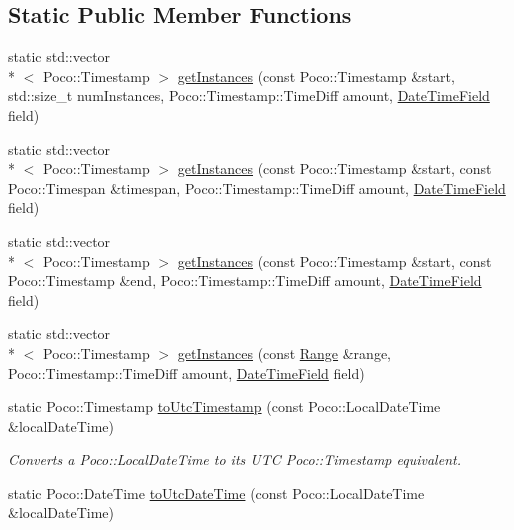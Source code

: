 \subsection*{Static Public Member Functions}
\begin{DoxyCompactItemize}
\item 
static std\-::vector\\*
$<$ Poco\-::\-Timestamp $>$ \hyperlink{classofx_1_1_time_1_1_utils_acd07a3c4b5eba6fedf1a2c744a66ac6a}{get\-Instances} (const Poco\-::\-Timestamp \&start, std\-::size\-\_\-t num\-Instances, Poco\-::\-Timestamp\-::\-Time\-Diff amount, \hyperlink{classofx_1_1_time_1_1_utils_aaab0e5bd305761231f063a0701785112}{Date\-Time\-Field} field)
\item 
static std\-::vector\\*
$<$ Poco\-::\-Timestamp $>$ \hyperlink{classofx_1_1_time_1_1_utils_a7d48dcb41c6f936a7c8d2c45e23684b7}{get\-Instances} (const Poco\-::\-Timestamp \&start, const Poco\-::\-Timespan \&timespan, Poco\-::\-Timestamp\-::\-Time\-Diff amount, \hyperlink{classofx_1_1_time_1_1_utils_aaab0e5bd305761231f063a0701785112}{Date\-Time\-Field} field)
\item 
static std\-::vector\\*
$<$ Poco\-::\-Timestamp $>$ \hyperlink{classofx_1_1_time_1_1_utils_ae91b9a0148df1a02b16be045c793b944}{get\-Instances} (const Poco\-::\-Timestamp \&start, const Poco\-::\-Timestamp \&end, Poco\-::\-Timestamp\-::\-Time\-Diff amount, \hyperlink{classofx_1_1_time_1_1_utils_aaab0e5bd305761231f063a0701785112}{Date\-Time\-Field} field)
\item 
static std\-::vector\\*
$<$ Poco\-::\-Timestamp $>$ \hyperlink{classofx_1_1_time_1_1_utils_aadd395d70f52dcfbd655baee45dc33ed}{get\-Instances} (const \hyperlink{classofx_1_1_time_1_1_range}{Range} \&range, Poco\-::\-Timestamp\-::\-Time\-Diff amount, \hyperlink{classofx_1_1_time_1_1_utils_aaab0e5bd305761231f063a0701785112}{Date\-Time\-Field} field)
\item 
\hypertarget{classofx_1_1_time_1_1_utils_a9e1c01fc626b4cf7f0c8f145b8ac7ff6}{static Poco\-::\-Timestamp \hyperlink{classofx_1_1_time_1_1_utils_a9e1c01fc626b4cf7f0c8f145b8ac7ff6}{to\-Utc\-Timestamp} (const Poco\-::\-Local\-Date\-Time \&local\-Date\-Time)}\label{classofx_1_1_time_1_1_utils_a9e1c01fc626b4cf7f0c8f145b8ac7ff6}

\begin{DoxyCompactList}\small\item\em Converts a Poco\-::\-Local\-Date\-Time to its U\-T\-C Poco\-::\-Timestamp equivalent. \end{DoxyCompactList}\item 
\hypertarget{classofx_1_1_time_1_1_utils_a69ea2e034f118c86ce9320f0e7ac4687}{static Poco\-::\-Date\-Time \hyperlink{classofx_1_1_time_1_1_utils_a69ea2e034f118c86ce9320f0e7ac4687}{to\-Utc\-Date\-Time} (const Poco\-::\-Local\-Date\-Time \&local\-Date\-Time)}\label{classofx_1_1_time_1_1_utils_a69ea2e034f118c86ce9320f0e7ac4687}


\end{DoxyCompactItemize}
